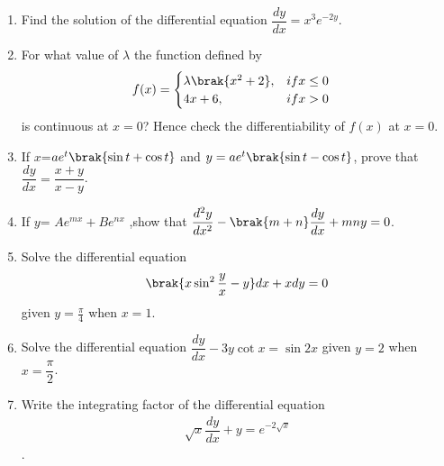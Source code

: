 \begin{enumerate}

\item Find the solution of the differential equation $\dfrac{dy}{dx} = x^{3}e^{-2y}$.\\

\item For what value of $\lambda$ the function defined by 
\begin{align*} f(x) &= \begin{cases}\lambda\brak{x^2 +2},&if x\leq0 \\ 4x+6 , &if x>0 \end{cases} \end{align*}
is continuous at $x=0$? Hence check the differentiability of $f(x)$ at $x=0$.\\

\item If $x$=$ae^t\brak{\sin{t}+\cos{t}}$ and $y=ae^t \brak{\sin{t}-\cos{t}}$, prove that $\dfrac{dy}{dx} = \dfrac{x+y}{x-y}$.\\

\item If $y$= $Ae^{mx}+Be^{nx}$ ,show that $\dfrac{d^2 y}{dx^2}-\brak{m+n}\dfrac{dy}{dx} + mny = 0$.\\

\item Solve the differential equation 
\begin{align*}
\brak{x \sin^2{\frac{y}{x}}-y}dx + xdy =0
\end{align*}
given $y = \frac{\pi}{4}$ when $x=1$.\\

\item Solve the differential equation $\dfrac{dy}{dx}- 3y\cot{x} = \sin{2x}$ given $y=2$ when $x=\dfrac{\pi}{2}$.\\

\item Write the integrating factor of the differential equation 
\begin{align*}
\sqrt{x}\dfrac{dy}{dx}+y = e^{-2\sqrt{x}}
\end{align*}.
\end{enumerate}
